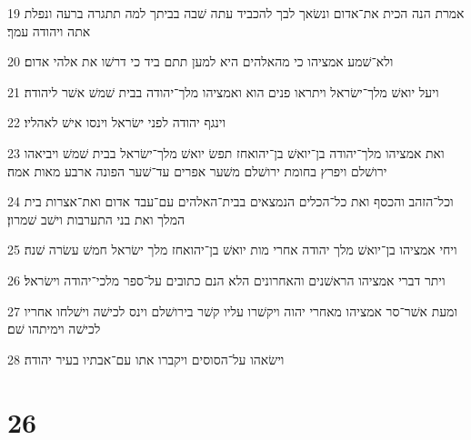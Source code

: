 \par 19 אמרת הנה הכית את־אדום ונשׂאך לבך להכביד עתה שׁבה בביתך למה תתגרה ברעה ונפלת אתה ויהודה עמך׃
\par 20 ולא־שׁמע אמציהו כי מהאלהים היא למען תתם ביד כי דרשׁו את אלהי אדום׃
\par 21 ויעל יואשׁ מלך־ישׂראל ויתראו פנים הוא ואמציהו מלך־יהודה בבית שׁמשׁ אשׁר ליהודה׃
\par 22 וינגף יהודה לפני ישׂראל וינסו אישׁ לאהליו׃
\par 23 ואת אמציהו מלך־יהודה בן־יואשׁ בן־יהואחז תפשׂ יואשׁ מלך־ישׂראל בבית שׁמשׁ ויביאהו ירושׁלם ויפרץ בחומת ירושׁלם משׁער אפרים עד־שׁער הפונה ארבע מאות אמה׃
\par 24 וכל־הזהב והכסף ואת כל־הכלים הנמצאים בבית־האלהים עם־עבד אדום ואת־אצרות בית המלך ואת בני התערבות וישׁב שׁמרון׃
\par 25 ויחי אמציהו בן־יואשׁ מלך יהודה אחרי מות יואשׁ בן־יהואחז מלך ישׂראל חמשׁ עשׂרה שׁנה׃
\par 26 ויתר דברי אמציהו הראשׁנים והאחרונים הלא הנם כתובים על־ספר מלכי־יהודה וישׂראל׃
\par 27 ומעת אשׁר־סר אמציהו מאחרי יהוה ויקשׁרו עליו קשׁר בירושׁלם וינס לכישׁה וישׁלחו אחריו לכישׁה וימיתהו שׁם׃
\par 28 וישׂאהו על־הסוסים ויקברו אתו עם־אבתיו בעיר יהודה׃

\chapter{26}

